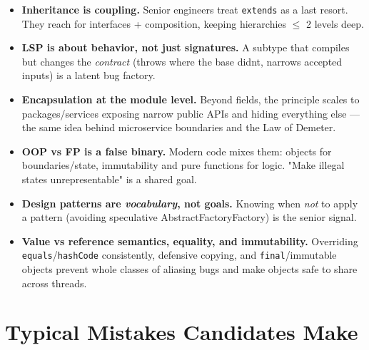 \documentclass[11pt]{article}
\providecommand{\tightlist}{\setlength{\itemsep}{1pt}\setlength{\parskip}{0pt}}
\begin{document}
\begin{itemize}
\tightlist
\item
  \textbf{Inheritance is coupling.} Senior engineers treat \texttt{extends} as a last resort. They reach for interfaces + composition, keeping hierarchies \(\leq\) 2 levels deep.
\item
  \textbf{LSP is about behavior, not just signatures.} A subtype that compiles but changes the \emph{contract} (throws where the base didn\textquotesingle t, narrows accepted inputs) is a latent bug factory.
\item
  \textbf{Encapsulation at the module level.} Beyond fields, the principle scales to packages/services exposing narrow public APIs and hiding everything else --- the same idea behind microservice boundaries and the Law of Demeter.
\item
  \textbf{OOP vs FP is a false binary.} Modern code mixes them: objects for boundaries/state, immutability and pure functions for logic. "Make illegal states unrepresentable" is a shared goal.
\item
  \textbf{Design patterns are \emph{vocabulary}, not goals.} Knowing when \emph{not} to apply a pattern (avoiding speculative AbstractFactoryFactory) is the senior signal.
\item
  \textbf{Value vs reference semantics, equality, and immutability.} Overriding \texttt{equals}/\texttt{hashCode} consistently, defensive copying, and \texttt{final}/immutable objects prevent whole classes of aliasing bugs and make objects safe to share across threads.
\end{itemize}

\section{Typical Mistakes Candidates Make}\label{typical-mistakes-candidates-make}
\end{document}

